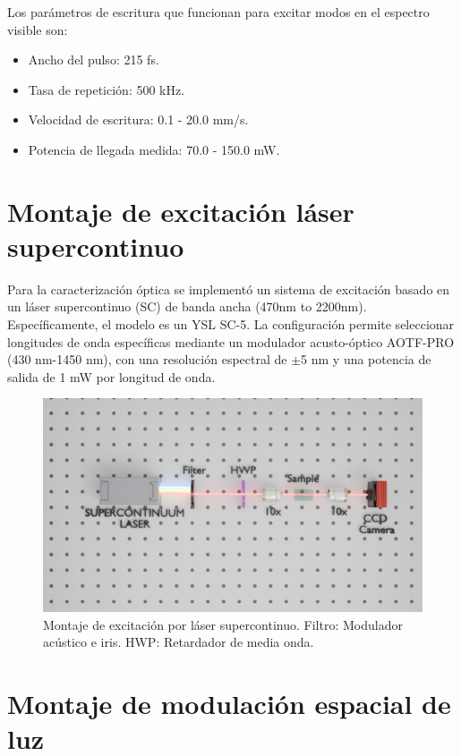 Los parámetros de escritura que funcionan para excitar modos en el espectro visible son:
\begin{itemize}
	\item Ancho del pulso: 215 fs.
    \item Tasa de repetición: 500 kHz.
    \item Velocidad de escritura: 0.1 - 20.0 mm/s.
    \item Potencia de llegada medida: 70.0 - 150.0 mW.
\end{itemize}

\section{Montaje de excitación láser supercontinuo \label{cap:wavelength}}

Para la caracterización óptica se implementó un sistema de excitación basado en un láser supercontinuo (SC) de banda ancha (470nm to 2200nm). Específicamente, el modelo es un YSL SC-5. La configuración permite seleccionar longitudes de onda específicas mediante un modulador acusto-óptico AOTF-PRO (430 nm-1450 nm), con una resolución espectral de $\pm$5 nm y una potencia de salida de 1 mW por longitud de onda.

\begin{figure}[H]
    \centering
    \includegraphics[width=\linewidth, trim={5cm 9cm 3cm 7cm},clip]{media/SC_setup}
    \caption[Montaje de excitación por láser supercontinuo.]{Montaje de excitación por láser supercontinuo. Filtro: Modulador acústico e iris. HWP: Retardador de media onda.}
\end{figure}

\section{Montaje de modulación espacial de luz}


